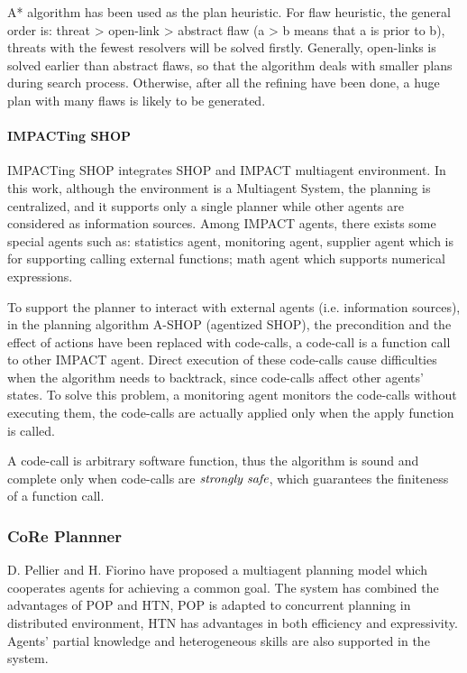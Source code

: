 A* algorithm has been used as the plan heuristic. For flaw heuristic, the general order is: threat > open-link > abstract flaw (a > b means that a is prior to b), threats with the fewest resolvers will be solved firstly. Generally, open-links is solved earlier than abstract flaws, so that the algorithm deals with smaller plans during search process. Otherwise, after all the refining have been done, a huge plan with many flaws is likely to be generated.

\paragraph*{IMPACTing SHOP}
IMPACTing SHOP \cite{ishop} integrates SHOP and IMPACT \cite{Impact} multiagent environment. In this work, although the environment is a Multiagent System, the planning is centralized, and it supports only a single planner while other agents are considered as information sources. Among IMPACT agents, there exists some special agents such as: statistics agent, monitoring agent, supplier agent which is for supporting calling external functions; math agent which supports numerical expressions.

To support the planner to interact with external agents (i.e. information sources), in the planning algorithm A-SHOP (agentized SHOP), the precondition and the effect of actions have been replaced with code-calls, a code-call is a function call to other IMPACT agent. Direct execution of these code-calls cause difficulties when the algorithm needs to backtrack, since code-calls affect other agents’ states. To solve this problem, a monitoring agent monitors the code-calls without executing them, the code-calls are actually applied only when the apply function is called.

A code-call is arbitrary software function, thus the algorithm is sound and complete only when code-calls are $\emph{strongly safe}$, which guarantees the finiteness of a function call.

\subsubsection*{CoRe Plannner}

D. Pellier and H. Fiorino\cite{multi2} have proposed a multiagent planning model which cooperates agents for achieving a common goal. The system has combined the advantages of POP and HTN, POP is adapted to concurrent planning in distributed environment, HTN has advantages in both efficiency and expressivity. Agents’ partial knowledge and heterogeneous skills are also supported in the system.

